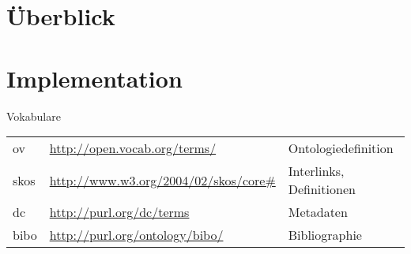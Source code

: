 \documentclass[14pt,aspectratio=1610]{beamer}
\author{\texorpdfstring{Konrad Höffner\newline\url{konrad.hoeffner@imise.uni-leipzig.de}}{Konrad Höffner}}
\title{}
\subtitle{SNIK Ontologie}
\begin{document}
\begin{frame}
\titlepage
\end{frame}

\section{Überblick}
\section{Implementation}

\begin{frame}{Vokabulare}
\begin{tabular}{lll}
ov		&\url{http://open.vocab.org/terms/}		&Ontologiedefinition\\
skos		&\url{http://www.w3.org/2004/02/skos/core\#}	&Interlinks, Definitionen\\
dc		&\url{http://purl.org/dc/terms}			&Metadaten\\
bibo		&\url{http://purl.org/ontology/bibo/}		&Bibliographie\\
\end{tabular}
\end{frame}
\end{document}
